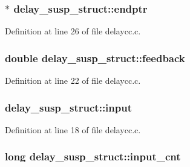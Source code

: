\subsubsection[{\texorpdfstring{endptr}{endptr}}]{$\ast$ delay\+\_\+susp\+\_\+struct\+::endptr}\hypertarget{structdelay__susp__struct_a513152deb31953215962b8ef253059e5}{}\label{structdelay__susp__struct_a513152deb31953215962b8ef253059e5}


Definition at line 26 of file delaycc.\+c.

\subsubsection[{\texorpdfstring{feedback}{feedback}}]{\setlength{\rightskip}{0pt plus 5cm}double delay\+\_\+susp\+\_\+struct\+::feedback}\hypertarget{structdelay__susp__struct_a86a44e76783dc3c926d9e97256f495a7}{}\label{structdelay__susp__struct_a86a44e76783dc3c926d9e97256f495a7}


Definition at line 22 of file delaycc.\+c.

\subsubsection[{\texorpdfstring{input}{input}}]{ delay\+\_\+susp\+\_\+struct\+::input}\hypertarget{structdelay__susp__struct_a3c6313c5372a74699f0e565e4261272a}{}\label{structdelay__susp__struct_a3c6313c5372a74699f0e565e4261272a}


Definition at line 18 of file delaycc.\+c.

\subsubsection[{\texorpdfstring{input\+\_\+cnt}{input_cnt}}]{\setlength{\rightskip}{0pt plus 5cm}long delay\+\_\+susp\+\_\+struct\+::input\+\_\+cnt}\hypertarget{structdelay__susp__struct_a18ba1459a54f13cac49f5a5d25e8a976}{}\label{structdelay__susp__struct_a18ba1459a54f13cac49f5a5d25e8a976}


